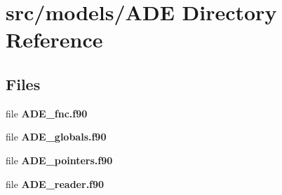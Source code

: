 \section{src/models/\+A\+DE Directory Reference}
\label{dir_edfc111d0f1763ec9775765eb8751b0a}
\subsection*{Files}
\begin{DoxyCompactItemize}
\item 
file {\bf A\+D\+E\+\_\+fnc.\+f90}
\item 
file {\bf A\+D\+E\+\_\+globals.\+f90}
\item 
file {\bf A\+D\+E\+\_\+pointers.\+f90}
\item 
file {\bf A\+D\+E\+\_\+reader.\+f90}
\end{DoxyCompactItemize}
